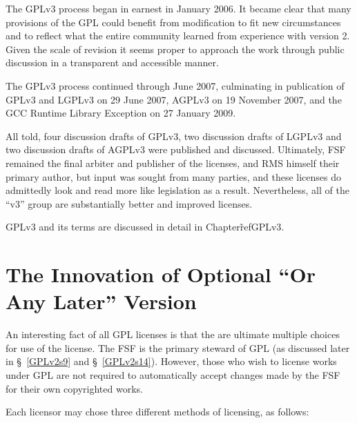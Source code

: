 The GPLv3 process began in earnest in January 2006.  It became clear that
many provisions of the GPL could benefit from modification to fit new
circumstances and to reflect what the entire community learned from
experience with version 2.  Given the scale of revision it seems proper to
approach the work through public discussion in a transparent and accessible
manner.

The GPLv3 process continued through June 2007, culminating in publication of
GPLv3 and LGPLv3 on 29 June 2007, AGPLv3 on 19 November 2007, and the GCC
Runtime Library Exception on 27 January 2009.

All told, four discussion drafts of GPLv3, two discussion drafts of LGPLv3
and two discussion drafts of AGPLv3 were published and discussed.
Ultimately, FSF remained the final arbiter and publisher of the licenses, and
RMS himself their primary author, but input was sought from many parties, and
these licenses do admittedly look and read more like legislation as a result.
Nevertheless, all of the ``v3'' group are substantially better and improved
licenses.

GPLv3 and its terms are discussed in detail in Chapter\~ref{GPLv3}.

\section{The Innovation of Optional ``Or Any Later'' Version}

An interesting fact of all GPL licenses is that the are ultimate multiple
choices for use of the license.  The FSF is the primary steward of GPL (as
discussed later in \S~\ref{GPLv2s9} and \S~\ref{GPLv2s14}).  However, those
who wish to license works under GPL are not required to automatically accept
changes made by the FSF for their own copyrighted works.

Each licensor may chose three different methods of licensing, as follows:

